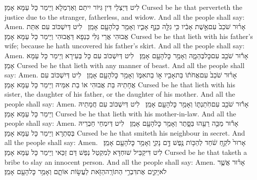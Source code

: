 {לִיט דְּיַצְלֵי דִּין גִּיּוֹר יִיתַם וְאַרְמְלָא וְיֵימַר כָּל עַמָּא אָמֵן׃}
{Cursed be he that perverteth the justice due to the stranger, fatherless, and widow. And all the people shall say: Amen.}{}
{אָר֗וּר שֹׁכֵב֙ עִם\maqqaf אֵ֣שֶׁת אָבִ֔יו כִּ֥י גִלָּ֖ה כְּנַ֣ף אָבִ֑יו וְאָמַ֥ר כׇּל\maqqaf הָעָ֖ם אָמֵֽן׃ \setuma }
{לִיט דְּיִשְׁכּוֹב עִם אִתַּת אֲבוּהִי אֲרֵי גַּלִּי כַּנְפָא דַּאֲבוּהִי וְיֵימַר כָּל עַמָּא אָמֵן׃}
{Cursed be he that lieth with his father’s wife; because he hath uncovered his father’s skirt. And all the people shall say: Amen.}{}
{אָר֕וּר שֹׁכֵ֖ב עִם\maqqaf כׇּל\maqqaf בְּהֵמָ֑ה וְאָמַ֥ר כׇּל\maqqaf הָעָ֖ם אָמֵֽן׃ \setuma }
{לִיט דְּיִשְׁכּוֹב עִם כָּל בְּעִירָא וְיֵימַר כָּל עַמָּא אָמֵן׃}
{Cursed be he that lieth with any manner of beast. And all the people shall say: Amen.}{}
{אָר֗וּר שֹׁכֵב֙ עִם\maqqaf אֲחֹת֔וֹ בַּת\maqqaf אָבִ֖יו א֣וֹ בַת\maqqaf אִמּ֑וֹ וְאָמַ֥ר כׇּל\maqqaf הָעָ֖ם אָמֵֽן׃ \setuma }
{לִיט דְּיִשְׁכּוֹב עִם אֲחָתֵיהּ בַּת אֲבוּהִי אוֹ בַת אִמֵּיהּ וְיֵימַר כָּל עַמָּא אָמֵן׃}
{Cursed be he that lieth with his sister, the daughter of his father, or the daughter of his mother. And all the people shall say: Amen.}{}
{אָר֕וּר שֹׁכֵ֖ב עִם\maqqaf חֹֽתַנְתּ֑וֹ וְאָמַ֥ר כׇּל\maqqaf הָעָ֖ם אָמֵֽן׃ \setuma }
{לִיט דְּיִשְׁכּוֹב עִם חֲמָתֵיהּ וְיֵימַר כָּל עַמָּא אָמֵן׃}
{Cursed be he that lieth with his mother-in-law. And all the people shall say: Amen.}{}
{אָר֕וּר מַכֵּ֥ה רֵעֵ֖הוּ בַּסָּ֑תֶר וְאָמַ֥ר כׇּל\maqqaf הָעָ֖ם אָמֵֽן׃ \setuma }
{לִיט דְּיִמְחֵי חַבְרֵיהּ בְּסִתְרָא וְיֵימַר כָּל עַמָּא אָמֵן׃}
{Cursed be he that smiteth his neighbour in secret. And all the people shall say: Amen.}{}
{אָרוּר֙ לֹקֵ֣חַ שֹׁ֔חַד לְהַכּ֥וֹת נֶ֖פֶשׁ דָּ֣ם נָקִ֑י וְאָמַ֥ר כׇּל\maqqaf הָעָ֖ם אָמֵֽן׃ \setuma }
{לִיט דִּיקַבֵּיל שׁוּחְדָּא לְמִקְטַל נְפַשׁ דַּם זַכַּאי וְיֵימַר כָּל עַמָּא אָמֵן׃}
{Cursed be he that taketh a bribe to slay an innocent person. And all the people shall say: Amen.}{}
{אָר֗וּר אֲשֶׁ֧ר לֹא\maqqaf יָקִ֛ים אֶת\maqqaf דִּבְרֵ֥י הַתּוֹרָֽה\maqqaf הַזֹּ֖את לַעֲשׂ֣וֹת אוֹתָ֑ם וְאָמַ֥ר כׇּל\maqqaf הָעָ֖ם אָמֵֽן׃ \petucha }
